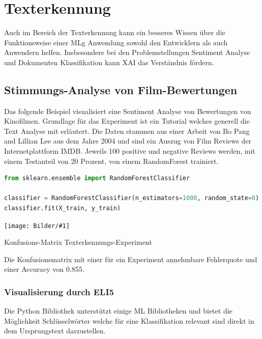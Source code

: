 \documentclass[
  12pt, %
  a4paper, %
  oneside, %
  openany, 
  numbers=noenddot, %
  BCOR=5mm, %
  parskip=half*, %
  thesis, %
]{bfhbook}
\newcommand{\imgText}[3]{
\begin{center}
    \begin{minipage}[t]{0.6\textwidth}
    		\vspace{0pt}
		\texttt{[image: Bilder/\#1]}
		\caption{#2}
	\end{minipage}\hfill
    \begin{minipage}[t]{0.4\textwidth}
    		\vspace{20pt}
  		#3
    \end{minipage}
\end{center}
}
\begin{document}
\section{Texterkennung}
Auch im Bereich der Texterkennung kann ein besseres Wissen über die Funktionsweise einer \Gls{MLg} Anwendung sowohl den Entwicklern als auch Anwendern helfen. Insbesondere bei den Problemstellungen Sentiment Analyse und Dokumenten Klassifikation kann \Gls{XAI} das Verständnis fördern.

\subsection{Stimmungs-Analyse von Film-Bewertungen}
Das folgende Beispiel visualisiert eine Sentiment Analyse von Bewertungen von Kinofilmen. Grundlage für das Experiment ist ein Tutorial \cite{movieReview} welches generell die Text Analyse mit \cite{scikit-learnLink} erläutert. Die Daten stammen aus einer Arbeit von Bo Pang and Lillian Lee \parencite{Pang+Lee2004} aus dem Jahre 2004 und sind ein Auszug von Film Reviews der Internetplattform IMDB. Jeweils 100 positive und negative Reviews werden, mit einem Testanteil von 20 Prozent, von einem RandomForest trainiert.

\parencite{textClassEli5}

\begin{lstlisting}[language=Python]
from sklearn.ensemble import RandomForestClassifier

classifier = RandomForestClassifier(n_estimators=1000, random_state=0)
classifier.fit(X_train, y_train)
\end{lstlisting}

\imgText{MovieReviews-SentimentClassification_ConfMatrix.PNG}{Konfusions-Matrix Texterkennungs-Experiment}{
}
Die Konfusionsmatrix mit einer für ein Experiment annehmbare Fehlerquote und einer Accuracy von 0.855.

\subsubsection*{Visualisierung durch ELI5}
Die Python Bibliothek \cite{ELI5} unterstützt einige \gls{ML} Bibliotheken und bietet die Möglichkeit Schlüsselwörter welche für eine Klassifikation relevant sind direkt in dem Ursprungstext darzustellen. 
\end{document}
